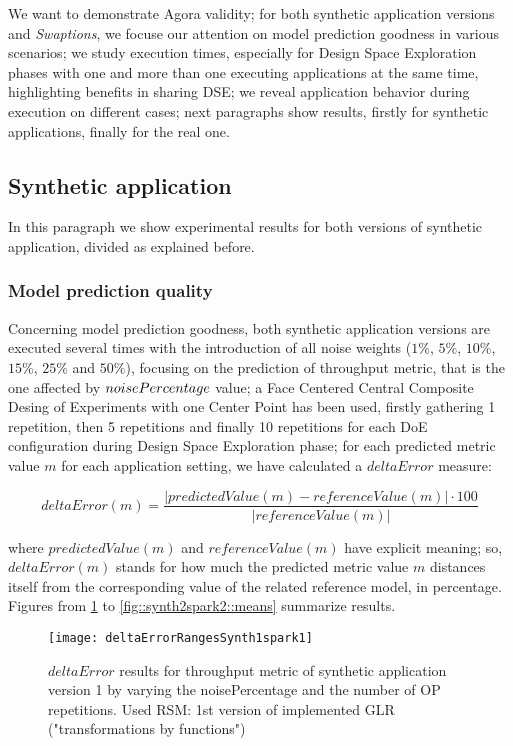 We want to demonstrate Agora validity; for both synthetic application versions and \textit{Swaptions}, we focuse our attention on model prediction goodness in various scenarios; we study execution times, especially for Design Space Exploration phases with one and more than one executing applications at the same time, highlighting benefits in sharing DSE; we reveal application behavior during execution on different cases; next paragraphs show results, firstly for synthetic applications, finally for the real one.


\subsection{Synthetic application}

In this paragraph we show experimental results for both versions of synthetic application, divided as explained before.


\subsubsection{Model prediction quality}\label{deltaErrorExplanation}

Concerning model prediction goodness, both synthetic application versions are executed several times with the introduction of all noise weights ($1\%$, $5\%$, $10\%$, $15\%$, $25\%$ and $50\%$), focusing on the prediction of throughput metric, that is the one affected by $noise\-Percentage$ value; a Face Centered Central Composite Desing of Experiments with one Center Point has been used, firstly gathering 1 repetition, then 5 repetitions and finally 10 repetitions for each DoE configuration during Design Space Exploration phase; for each predicted metric value $m$ for each application setting, we have calculated a $deltaError$ measure:

\[
deltaError(m) = \dfrac{\left\vert predictedValue(m) - referenceValue(m) \right\vert \cdot 100}{\left\vert referenceValue(m) \right\vert}
\]

where $predictedValue(m)$ and $referenceValue(m)$ have explicit meaning; so, $deltaError(m)$ stands for how much the predicted metric value $m$ distances itself from the corresponding value of the related reference model, in percentage. Figures from \ref{fig::synth1spark1::intervals} to \ref{fig::synth2spark2::means} summarize results.





\begin{figure}[htb]

    \centering
    
    \texttt{[image: deltaErrorRangesSynth1spark1]}
    
     \caption{$deltaError$ results for throughput metric of synthetic application version 1 by varying the noisePercentage and the number of OP repetitions. Used RSM: 1st version of implemented GLR ("transformations by functions")}
    
    \label{fig::synth1spark1::intervals}
    
\end{figure}

